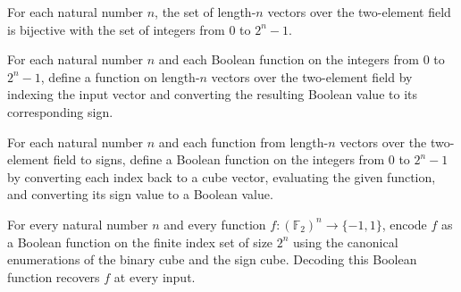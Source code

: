 \begin{definition}
\leanok
{}
For each natural number $n$, the set of length-$n$ vectors over the two-element field is
bijective with the set of integers from $0$ to $2^n-1$.
\end{definition}

\begin{definition}
\leanok
{}
For each natural number $n$ and each Boolean function on the integers from $0$ to
$2^n-1$, define a function on length-$n$ vectors over the two-element field by indexing
the input vector and converting the resulting Boolean value to its corresponding sign.
\end{definition}

\begin{definition}
\leanok
{}
For each natural number $n$ and each function from length-$n$ vectors over the
two-element field to signs, define a Boolean function on the integers from $0$ to
$2^n-1$ by converting each index back to a cube vector, evaluating the given function,
and converting its sign value to a Boolean value.
\end{definition}

\begin{theorem}
\leanok
{}
For every natural number $n$ and every function $f:(\mathbb{F}_2)^n\to\{-1,1\}$, encode
$f$ as a Boolean function on the finite index set of size $2^n$ using the canonical
enumerations of the binary cube and the sign cube. Decoding this Boolean function
recovers $f$ at every input.
\end{theorem}

